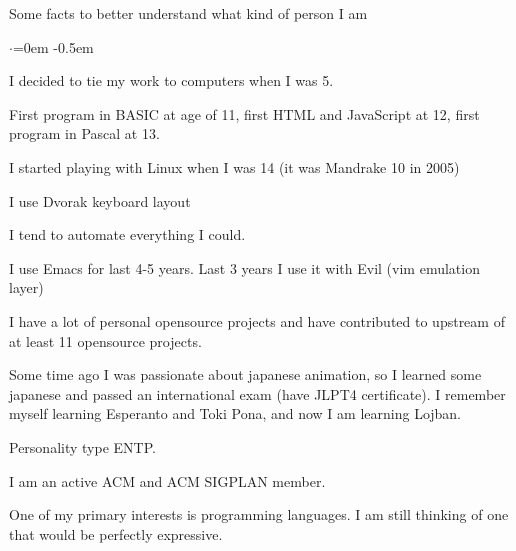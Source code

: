 \documentclass{resume} %
\begin{document}
\begin{rSection}{Some facts to better understand what kind of person I am}
  \smallskip
  \begin{list}{$\cdot$}{\leftmargin=0em} %
    \itemsep -0.5em \vspace{-0.5em} %
  \item I decided to tie my work to computers when I was 5.
  \item First program in BASIC at age of 11, first HTML and JavaScript at 12, first program in Pascal at 13.
  \item I started playing with Linux when I was 14 (it was Mandrake 10 in 2005)
  \item I use Dvorak keyboard layout
  \item I tend to automate everything I could.
  \item I use Emacs for last 4-5 years. Last 3 years I use it with Evil (vim emulation layer)
  \item I have a lot of personal opensource projects and have contributed to
        upstream of at least 11 opensource projects.
  \item Some time ago I was passionate about japanese animation, so I learned
        some japanese and passed an international exam (have JLPT4 certificate). I remember myself
        learning Esperanto and Toki Pona, and now I am learning Lojban.
  \item Personality type ENTP.
  \item I am an active ACM and ACM SIGPLAN member.
  \item One of my primary interests is programming languages. I am still thinking of one
        that would be perfectly expressive.
  \end{list}
\end{rSection}

\end{document}

